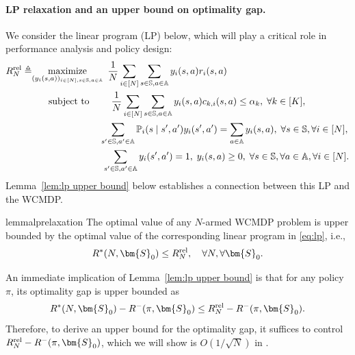 \documentclass{article}
\theoremstyle{plain}
\theoremstyle{remark}
\newcommand{\sspa}{\mathbb{S}}
\newcommand{\aspa}{\mathbb{A}}
\newcommand{\rel}{\textup{rel}} %
\newcommand{\PP}{\mathbb{P} }
\begin{document}
\paragraph{LP relaxation and an upper bound on optimality gap.}
We consider the linear program (LP) below, which will play a critical role in performance analysis and policy design:
\begin{subequations}\label{eq:lp}
\begin{align}
    R^{\rel}_N\triangleq&\underset{(y_i(s,a))_{i\in [N], s\in\sspa,a\in\aspa}}{\text{maximize}}\mspace{9mu}\frac{1}{N}\sum_{i\in[N]} \sum_{s\in\sspa,a\in\aspa} y_i(s,a)r_i(s,a)\\
    \label{eq:lp:budget-constraint}
    &\mspace{32mu}\text{subject to}\mspace{42mu}\frac{1}{N}\sum_{i\in[N]}\sum_{s\in\sspa,a\in\aspa} y_i(s,a)c_{k,i}(s,a)\leq \alpha_k,\;\forall k\in[K],\\
    \label{eq:lp:stationarity-constraint}
    &\mspace{130mu} \sum_{s'\in\sspa,a'\in\aspa} \PP_i(s\mid s',a')y_i(s',a')=\sum_{a\in\aspa}y_i(s,a),\;\forall s\in\sspa,\forall i\in[N],\\
    \label{eq:lp:probability-constraint}
   &\mspace{135mu}\sum_{s'\in\sspa,a'\in\aspa}y_i(s',a')=1, \; y_i(s,a)\geq 0, \; \forall s\in\sspa,  \forall a\in \aspa,\forall i\in[N].
\end{align}
\end{subequations}
Lemma~\ref{lem:lp upper bound} below establishes a connection between this LP and the WCMDP.
\begin{restatable}{lemma}{lprelaxation}\label{lem:lp upper bound}
The optimal value of any $N$-armed WCMDP problem is upper bounded by the optimal value of the corresponding linear program in \eqref{eq:lp}, i.e.,
    \begin{align*}
        R^*(N,\bm{S}_0)\le R_N^{\rel},\quad\forall N,\forall \bm{S}_0.
    \end{align*}
\end{restatable}

An immediate implication of Lemma~\ref{lem:lp upper bound} is that for any policy $\pi$, its optimality gap is upper bounded as
\begin{equation}
    R^*(N,\bm{S}_0)-R^-(\pi,\bm{S}_0) \le R_N^{\rel}-R^-(\pi,\bm{S}_0).
\end{equation}
Therefore, to derive an upper bound for the optimality gap, it suffices to control $R_N^{\rel}-R^-(\pi,\bm{S}_0)$, which we will show is $O(1/\sqrt{N})$ in . 
\end{document}
